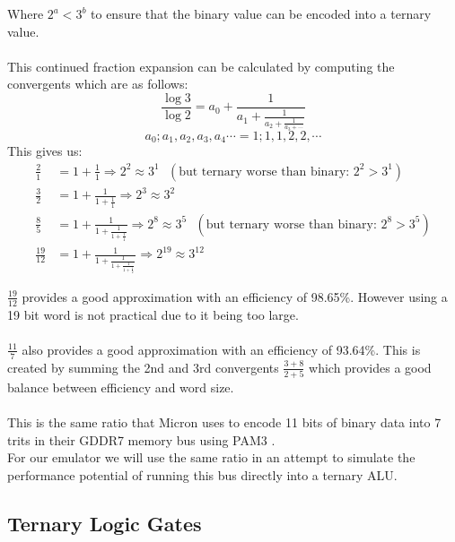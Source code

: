 \documentclass[12pt]{article}
\begin{document}
Where $2^{a} < 3^{b}$ to ensure that the binary value can be encoded into a ternary value.\\
\\
This continued fraction expansion can be calculated by computing the convergents which are as follows:
\begin{equation}
    \frac{\log 3}{\log 2} = a_0 + \frac{1}{a_1 + \frac{1}{a_2 + \frac{1}{a_3 + \dotsb}}}
\end{equation}
\begin{equation}
    {a_0; a_1, a_2, a_3, a_4 \dotsb} = {1; 1, 1, 2, 2, \dotsb}
\end{equation}
This gives us:
\begin{align*}
    \frac{2}{1} &= 1 + \frac{1}{1} \Rightarrow 2^{2} \approx 3^{1} \text {  } (\text{but ternary worse than binary: } 2^{2} > 3^{1})\\
    \frac{3}{2} &= 1 + \frac{1}{1 + \frac{1}{1}} \Rightarrow 2^{3} \approx 3^{2} \\
    \frac{8}{5} &= 1 + \frac{1}{1 + \frac{1}{1 + \frac{1}{1}}} \Rightarrow 2^{8} \approx 3^{5} \text {  } (\text{but ternary worse than binary: } 2^{8} > 3^{5})\\
    \frac{19}{12} &= 1 + \frac{1}{1 + \frac{1}{1 + \frac{1}{1 + \frac{1}{2}}}} \Rightarrow 2^{19} \approx 3^{12}
\end{align*}

$\frac{19}{12}$ provides a good approximation with an efficiency of 98.65\%. However using a 19 bit word is not practical due to it being 
too large.\\
\\
$\frac{11}{7}$ also provides a good approximation with an efficiency of 93.64\%. This is created by summing the 2nd and 3rd convergents
$\frac{3+8}{2+5}$ which provides a good balance between efficiency and word size.\\
\\
This is the same ratio that Micron uses to encode 11 bits of binary data into 7 trits in their GDDR7 memory bus using PAM3 \citep{micron2024gddr7}.\\
For our emulator we will use the same ratio in an attempt to simulate the performance potential of running this bus directly into a ternary ALU.\\

\subsection{Ternary Logic Gates}
\end{document}
